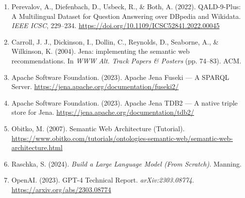 \documentclass[12pt,a4paper,onecolumn]{article}
\begin{document}
\begin{enumerate}
  \item Perevalov, A., Diefenbach, D., Usbeck, R., \& Both, A. (2022). QALD-9-Plus: A Multilingual Dataset for Question Answering over DBpedia and Wikidata. \textit{IEEE ICSC}, 229--234. \url{https://doi.org/10.1109/ICSC52841.2022.00045}
  \item Carroll, J. J., Dickinson, I., Dollin, C., Reynolds, D., Seaborne, A., \& Wilkinson, K. (2004). Jena: implementing the semantic web recommendations. In \textit{WWW Alt. Track Papers \& Posters} (pp. 74--83). ACM.
  \item Apache Software Foundation. (2023). Apache Jena Fuseki — A SPARQL Server. \url{https://jena.apache.org/documentation/fuseki2/}
  \item Apache Software Foundation. (2023). Apache Jena TDB2 — A native triple store for Jena. \url{https://jena.apache.org/documentation/tdb2/}
  \item Obitko, M. (2007). Semantic Web Architecture (Tutorial). \url{https://www.obitko.com/tutorials/ontologies-semantic-web/semantic-web-architecture.html}
  \item Raschka, S. (2024). \textit{Build a Large Language Model (From Scratch)}. Manning.
  \item OpenAI. (2023). GPT-4 Technical Report. \textit{arXiv:2303.08774}. \url{https://arxiv.org/abs/2303.08774}
\end{enumerate}
\endgroup
\end{document}
